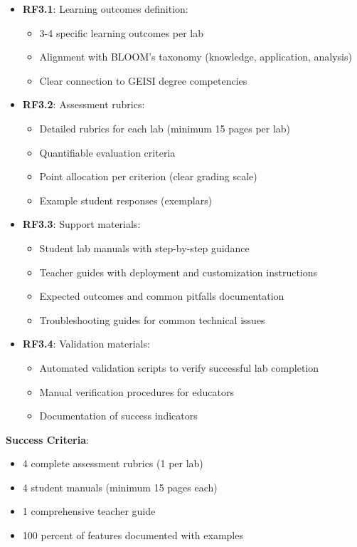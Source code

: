 \begin{itemize}

\item \textbf{RF3.1}: Learning outcomes definition:
\begin{itemize}
\item 3-4 specific learning outcomes per lab
\item Alignment with BLOOM's taxonomy (knowledge, application, analysis)
\item Clear connection to GEISI degree competencies
\end{itemize}

\item \textbf{RF3.2}: Assessment rubrics:
\begin{itemize}
\item Detailed rubrics for each lab (minimum 15 pages per lab)
\item Quantifiable evaluation criteria
\item Point allocation per criterion (clear grading scale)
\item Example student responses (exemplars)
\end{itemize}

\item \textbf{RF3.3}: Support materials:
\begin{itemize}
\item Student lab manuals with step-by-step guidance
\item Teacher guides with deployment and customization instructions
\item Expected outcomes and common pitfalls documentation
\item Troubleshooting guides for common technical issues
\end{itemize}

\item \textbf{RF3.4}: Validation materials:
\begin{itemize}
\item Automated validation scripts to verify successful lab completion
\item Manual verification procedures for educators
\item Documentation of success indicators
\end{itemize}

\end{itemize}

\textbf{Success Criteria}:
\begin{itemize}
\item 4 complete assessment rubrics (1 per lab)
\item 4 student manuals (minimum 15 pages each)
\item 1 comprehensive teacher guide
\item 100 percent of features documented with examples
\end{itemize}

